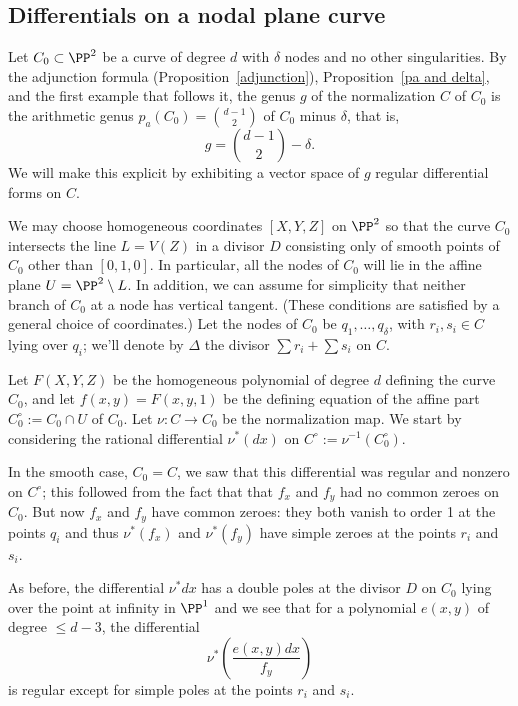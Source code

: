 \subsection{Differentials on a nodal plane curve}\label{canonical series on nodal plane curves}

Let $C_{0} \subset \PP^2$  be a curve of degree $d$ with $\delta$ nodes and no other singularities. By the adjunction
formula (Proposition~\ref{adjunction}), Proposition~\ref{pa and delta}, and the first example that follows it, 
the genus $g$ of the normalization $C$ of $C_{0}$ is
the arithmetic genus $p_{a}(C_{0}) = \binom{d-1}{2}$ of $C_{0}$ minus $\delta$, that is,
$$
g = \binom{d-1}{2} -\delta.
$$
We will make this explicit by exhibiting a vector space of $g$ regular differential forms on $C$.

We may choose homogeneous coordinates  $[X,Y,Z]$ on $\PP^2$ so that the curve $C_0$ intersects the line $L = V(Z)$ in a divisor $D$ consisting only of smooth points of $C_{0}$  other than $[0,1,0]$. In particular,  all the nodes of $C_0$ will lie in the affine plane $U = \PP^2 \setminus L$.
In addition, we can assume for simplicity that  neither branch of $C_0$ at a node has vertical tangent. (These conditions are satisfied by a general choice of coordinates.) Let the nodes of $C_0$ be $q_1,\dots,q_\delta$, with $r_i, s_i \in C$ lying over $q_i$; we'll denote by $\Delta$ the divisor $\sum r_i + \sum s_i$ on $C$.

Let $F(X,Y,Z)$ be the homogeneous polynomial of degree $d$ defining the curve $C_0$, and let $f(x,y) = F(x,y,1)$ be the defining equation of the affine part $C_{0}^{\circ}:= C_0 \cap U$ of $C_0$. Let $\nu: C\to C_0$ be the normalization map. We start by considering the rational differential 
$\nu^*(dx)$ on 
$C^{\circ}:= \nu^{-1}(C_{0}^{\circ})$. 

In the smooth case, $C_{0}=C$, we saw that this differential was regular and nonzero on $C^{\circ}$; this followed from the fact that 
that $f_{x}$ and $f_{y}$ had no common zeroes on $C_0$. But now $f_{x}$ and $f_{y}$ have common zeroes: they both vanish to order 1 at the points $q_{i}$ and thus $\nu^*(f_{x})$ and $\nu^*(f_{y})$ have simple zeroes at the points $r_i$ and $s_i$. 

As before, the differential $\nu^*dx$ has a double poles at the divisor $D$ on $C_{0}$ lying over the point at infinity in $\PP^{1}$
and we see that for a polynomial $e(x,y)$ of degree $\leq d-3$, the differential
$$
\nu^*( \frac{e(x,y)dx}{f_{y}})
$$
is regular except for simple poles at the points $r_i$ and $s_i$.

